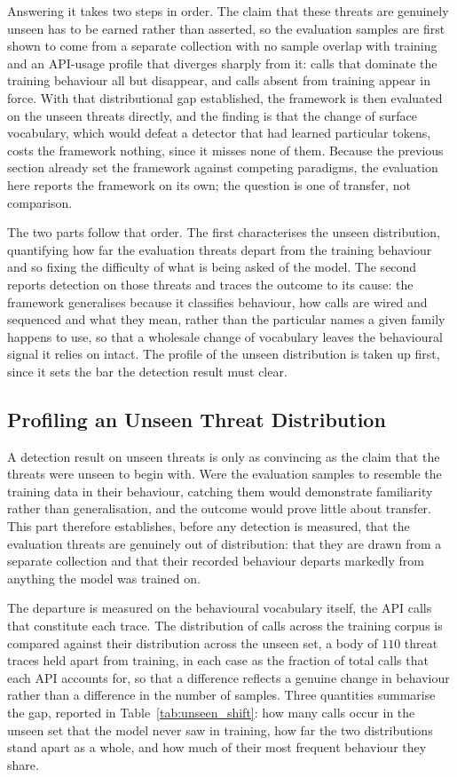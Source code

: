 \documentclass[%
    BCOR=10mm,
    DIV=13,
    toc=bibliography,
    toc=listof,
    oneside,
    12pt,
]{scrbook}
\begin{document}
Answering it takes two steps in order. The claim that these threats are genuinely
unseen has to be earned rather than asserted, so the evaluation samples are first
shown to come from a separate collection with no sample overlap with training and
an API-usage profile that diverges sharply from it: calls that dominate the
training behaviour all but disappear, and calls absent from training appear in
force. With that distributional gap established, the framework is then evaluated on
the unseen threats directly, and the finding is that the change of surface
vocabulary, which would defeat a detector that had learned particular tokens, costs
the framework nothing, since it misses none of them. Because the previous section
already set the framework against competing paradigms, the evaluation here reports
the framework on its own; the question is one of transfer, not comparison.

The two parts follow that order. The first characterises the unseen distribution,
quantifying how far the evaluation threats depart from the training behaviour and
so fixing the difficulty of what is being asked of the model. The second reports
detection on those threats and traces the outcome to its cause: the framework
generalises because it classifies behaviour, how calls are wired and sequenced and
what they mean, rather than the particular names a given family happens to use, so
that a wholesale change of vocabulary leaves the behavioural signal it relies on
intact. The profile of the unseen distribution is taken up first, since it sets the
bar the detection result must clear.

\subsection{Profiling an Unseen Threat Distribution}
\label{subsec:lofo_results}

A detection result on unseen threats is only as convincing as the claim that the
threats were unseen to begin with. Were the evaluation samples to resemble the
training data in their behaviour, catching them would demonstrate familiarity
rather than generalisation, and the outcome would prove little about transfer. This
part therefore establishes, before any detection is measured, that the evaluation
threats are genuinely out of distribution: that they are drawn from a separate
collection and that their recorded behaviour departs markedly from anything the
model was trained on.

The departure is measured on the behavioural vocabulary itself, the API calls that
constitute each trace. The distribution of calls across the training corpus is
compared against their distribution across the unseen set, a body of $110$ threat
traces held apart from training, in each case as the fraction of total calls that
each API accounts for, so that a difference reflects a genuine change in behaviour
rather than a difference in the number of samples.
Three quantities summarise the gap, reported in Table~\ref{tab:unseen_shift}: how
many calls occur in the unseen set that the model never saw in training, how far
the two distributions stand apart as a whole, and how much of their most frequent
behaviour they share.
\end{document}
